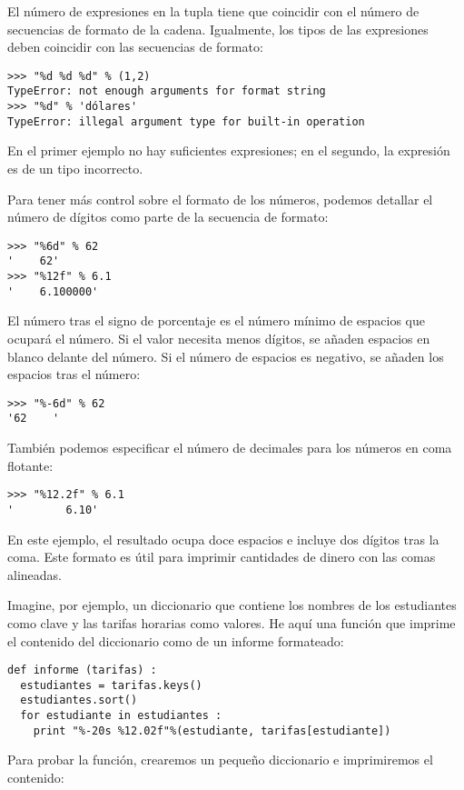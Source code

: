 El número de expresiones en la tupla tiene que coincidir con el número
de secuencias de formato de la cadena. Igualmente, los tipos de las
expresiones deben coincidir con las secuencias de formato:


\beforeverb
\begin{verbatim}
>>> "%d %d %d" % (1,2)
TypeError: not enough arguments for format string
>>> "%d" % 'dólares'
TypeError: illegal argument type for built-in operation
\end{verbatim}
\afterverb
%
En el primer ejemplo no hay suficientes expresiones; en el
segundo, la expresión es de un tipo incorrecto.

Para tener más control sobre el formato de los números, podemos detallar
el número de dígitos como parte de la secuencia de formato:

\beforeverb
\begin{verbatim}
>>> "%6d" % 62
'    62'
>>> "%12f" % 6.1
'    6.100000'
\end{verbatim}
\afterverb
%
El número tras el signo de porcentaje es el número mínimo de espacios
que ocupará el número. Si el valor necesita menos dígitos, se añaden
espacios en blanco delante del número. Si el número de espacios es
negativo, se añaden los espacios tras el número:

\beforeverb
\begin{verbatim}
>>> "%-6d" % 62
'62    '
\end{verbatim}
\afterverb
%
También podemos especificar el número de decimales para los
números en coma flotante:

\beforeverb
\begin{verbatim}
>>> "%12.2f" % 6.1
'        6.10'
\end{verbatim}
\afterverb
%
En este ejemplo, el resultado ocupa doce espacios e incluye dos dígitos
tras la coma. Este formato es útil para imprimir cantidades de dinero con
las comas alineadas.


Imagine, por ejemplo, un diccionario que contiene los nombres
de los estudiantes como clave y las tarifas horarias como valores.
He aquí una función que imprime el contenido del diccionario como
de un informe formateado:

\beforeverb
\begin{verbatim}
def informe (tarifas) :
  estudiantes = tarifas.keys()
  estudiantes.sort()
  for estudiante in estudiantes :
    print "%-20s %12.02f"%(estudiante, tarifas[estudiante])
\end{verbatim}
\afterverb
%
Para probar la función, crearemos un pequeño diccionario e
imprimiremos el contenido:

